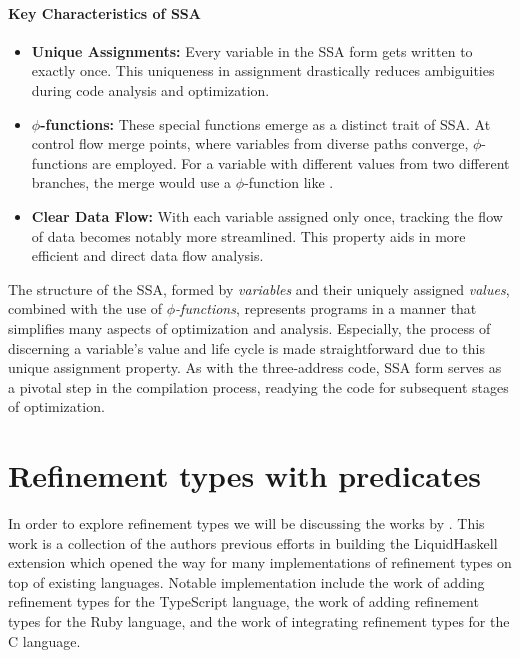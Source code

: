 \documentclass[
  oneside,
  english,
  coorientadorbanca,
  noabntexcite
]{ufsc-thesis-rn46-2019}
\newcommand{\code}[1]{\text{\scpfamily\setlength\spaceskip{0.35em}#1}}
\begin{document}
\subsubsection{Key Characteristics of SSA}

\begin{itemize}
  \item \textbf{Unique Assignments:} Every variable in the SSA form gets written to exactly once.
        This uniqueness in assignment drastically reduces ambiguities during code analysis and optimization.

  \item \textbf{$\phi$-functions:} These special functions emerge as a distinct trait of SSA\@.
        At control flow merge points, where variables from diverse paths converge, $\phi$-functions are employed.
        For a variable \code{x} with different values from two different branches, the merge would use a $\phi$-function like \code{x3 = $\phi$(x1, x2)}.

  \item \textbf{Clear Data Flow:} With each variable assigned only once, tracking the flow of data becomes notably more streamlined.
        This property aids in more efficient and direct data flow analysis.
\end{itemize}

The structure of the SSA, formed by \textit{variables} and their uniquely assigned \textit{values}, combined with the use of \textit{$\phi$-functions}, represents programs in a manner that simplifies many aspects of optimization and analysis.
Especially, the process of discerning a variable's value and life cycle is made straightforward due to this unique assignment property.
As with the three-address code, SSA form serves as a pivotal step in the compilation process, readying the code for subsequent stages of optimization.

\chapter{Refinement types with predicates}\label{ch:refinement_types}

In order to explore refinement types we will be discussing the works by \textcite{jhala2020tutorial}.
This work is a collection of the authors previous efforts in \textcite{vazou2014liquidhaskell} building the LiquidHaskell extension which opened the way for many implementations of refinement types on top of existing languages.
Notable implementation include the work of \textcite{vekris2016refinementtypescript} adding refinement types for the TypeScript language, the work of \textcite{vazou2018refinementruby} adding refinement types for the Ruby language, and the work of \textcite{sammler2021refinedc} integrating refinement types for the C language.
\end{document}
